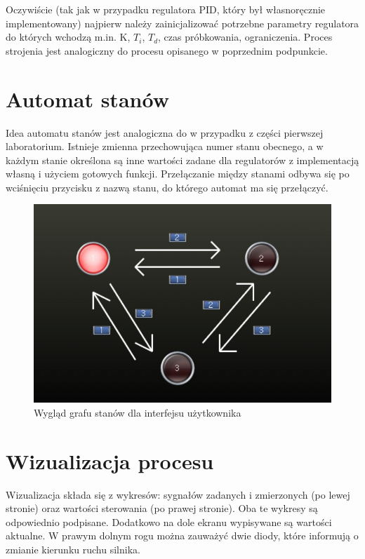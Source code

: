 Oczywiście (tak jak w przypadku regulatora PID, który był własnoręcznie implementowany) najpierw należy zainicjalizować potrzebne parametry regulatora do których wchodzą m.in. K, $T_i$, $T_d$, czas próbkowania, ograniczenia. Proces strojenia jest analogiczny do procesu opisanego w poprzednim podpunkcie.

\section{Automat stanów}
Idea automatu stanów jest analogiczna do w przypadku z części pierwszej laboratorium. Istnieje zmienna przechowująca numer stanu obecnego, a w każdym stanie określona są inne wartości zadane dla regulatorów z implementacją własną i użyciem gotowych funkcji. Przełączanie między stanami odbywa się po wciśnięciu przycisku z nazwą stanu, do którego automat ma się przełączyć.

 \begin{figure}[h]
    \centering
    \includegraphics[width=160mm]{../images/laby/grafstanow_tras.jpg}
    \caption{Wygląd grafu stanów dla interfejsu użytkownika}
    \end{figure}  

\section{Wizualizacja procesu}

Wizualizacja składa się z wykresów: sygnałów zadanych i zmierzonych (po lewej stronie) oraz wartości sterowania (po prawej stronie). Oba te wykresy są odpowiednio podpisane. Dodatkowo na dole ekranu wypisywane są wartości aktualne. W prawym dolnym rogu można zauważyć dwie diody, które informują o zmianie kierunku ruchu silnika.

